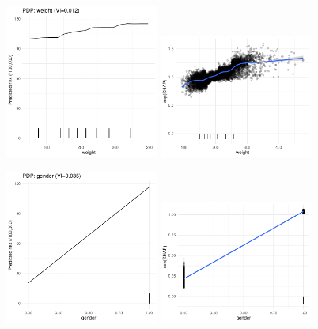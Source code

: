 \documentclass[12pt]{article}
\begin{document}
\begin{figure}[h]
\centering
\includegraphics[width=0.45\textwidth]{figures/pdp_new/weight.pdf}
\includegraphics[width=0.45\textwidth]{figures/shap_new/weight.pdf}
\end{figure}
\begin{figure}[h]
\centering
\includegraphics[width=0.45\textwidth]{figures/pdp_new/gender.pdf}
\includegraphics[width=0.45\textwidth]{figures/shap_new/gender.pdf}
\end{figure}
\end{document}

